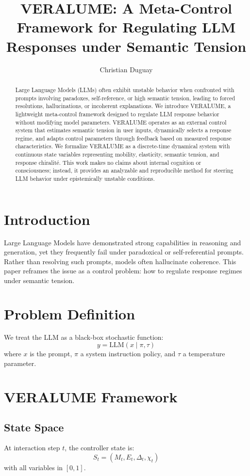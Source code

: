 \documentclass[11pt]{article}
\title{VERALUME: A Meta-Control Framework for Regulating LLM Responses under Semantic Tension}
\author{Christian Duguay}
\date{}
\begin{document}
\maketitle

\begin{abstract}
Large Language Models (LLMs) often exhibit unstable behavior when confronted with prompts involving paradoxes, self-reference, or high semantic tension, leading to forced resolutions, hallucinations, or incoherent explanations. We introduce VERALUME, a lightweight meta-control framework designed to regulate LLM response behavior without modifying model parameters. VERALUME operates as an external control system that estimates semantic tension in user inputs, dynamically selects a response regime, and adapts control parameters through feedback based on measured response characteristics. We formalize VERALUME as a discrete-time dynamical system with continuous state variables representing mobility, elasticity, semantic tension, and response chiralité. This work makes no claims about internal cognition or consciousness; instead, it provides an analyzable and reproducible method for steering LLM behavior under epistemically unstable conditions.
\end{abstract}

\section{Introduction}
Large Language Models have demonstrated strong capabilities in reasoning and generation, yet they frequently fail under paradoxical or self-referential prompts. Rather than resolving such prompts, models often hallucinate coherence. This paper reframes the issue as a control problem: how to regulate response regimes under semantic tension.

\section{Problem Definition}
We treat the LLM as a black-box stochastic function:
\[
y = \text{LLM}(x \mid \pi, \tau)
\]
where $x$ is the prompt, $\pi$ a system instruction policy, and $\tau$ a temperature parameter.

\section{VERALUME Framework}
\subsection{State Space}
At interaction step $t$, the controller state is:
\[
S_t = (M_t, E_t, \Delta_t, \chi_t)
\]
with all variables in $[0,1]$.
\end{document}
